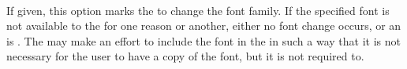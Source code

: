  \\

If given, this option marks the  to change the font family. If the specified font is not available to the  for one reason or another, either no font change occurs, or an  is . The  may make an effort to include the font in the  in such a way that it is not necessary for the user to have a copy of the font, but it is not required to. \\

\begin{examples}
\end{examples}

